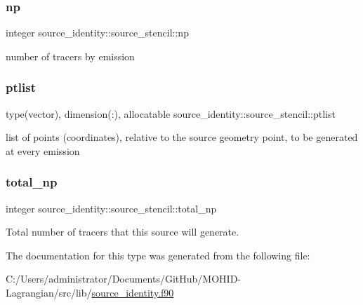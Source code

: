 \subsubsection{\texorpdfstring{np}{np}}
{\footnotesize\ttfamily integer source\+\_\+identity\+::source\+\_\+stencil\+::np\hspace{0.3cm}{\ttfamily [private]}}



number of tracers by emission 

\mbox{\label{structsource__identity_1_1source__stencil_a91822da10e869f72071fa29e2bb2c080}} 
\subsubsection{\texorpdfstring{ptlist}{ptlist}}
{\footnotesize\ttfamily type(vector), dimension(\+:), allocatable source\+\_\+identity\+::source\+\_\+stencil\+::ptlist\hspace{0.3cm}{\ttfamily [private]}}



list of points (coordinates), relative to the source geometry point, to be generated at every emission 

\mbox{\label{structsource__identity_1_1source__stencil_a11f7462457253157db252466b51000f2}} 
\subsubsection{\texorpdfstring{total\+\_\+np}{total\_np}}
{\footnotesize\ttfamily integer source\+\_\+identity\+::source\+\_\+stencil\+::total\+\_\+np\hspace{0.3cm}{\ttfamily [private]}}



Total number of tracers that this source will generate. 



The documentation for this type was generated from the following file\+:\begin{DoxyCompactItemize}
\item 
C\+:/\+Users/administrator/\+Documents/\+Git\+Hub/\+M\+O\+H\+I\+D-\/\+Lagrangian/src/lib/\mbox{\hyperlink{source__identity_8f90}{source\+\_\+identity.\+f90}}\end{DoxyCompactItemize}

